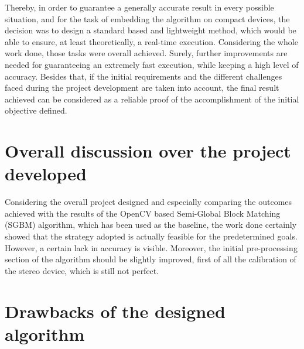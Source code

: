 Thereby, in order to guarantee a generally accurate result in every possible situation, and for the task of embedding the algorithm on compact devices, the decision was to design a standard based and lightweight method, which would be able to ensure, at least theoretically, a real-time execution.
Considering the whole work done, those tasks were overall achieved.
Surely, further improvements are needed for guaranteeing an extremely fast execution, while keeping a high level of accuracy.
Besides that, if the initial requirements and the different challenges faced during the project development are taken into account, the final result achieved can be considered as a reliable proof of the accomplishment of the initial objective defined.

\section{Overall discussion over the project developed}
\label{section:overall-discussion}

Considering the overall project designed and especially comparing the outcomes achieved with the results of the OpenCV based Semi-Global Block Matching (SGBM) algorithm, which has been used as the baseline, the work done certainly showed that the strategy adopted is actually feasible for the predetermined goals.\\
However, a certain lack in accuracy is visible.
Moreover, the initial pre-processing section of the algorithm should be slightly improved, first of all the calibration of the stereo device, which is still not perfect. 

\section{Drawbacks of the designed algorithm}
\label{section:algorithm-drawbacks}


